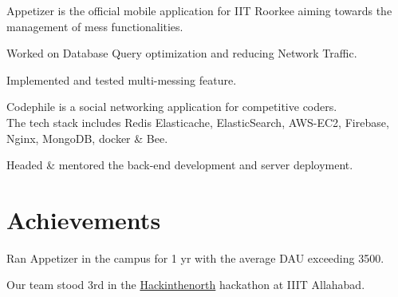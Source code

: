 \documentclass[letterpaper]{deedy-resume} %
\begin{document}
\begin{minipage}[t]{0.66\textwidth}
Appetizer is the official mobile application for IIT Roorkee aiming towards the management of mess functionalities.
\begin{tightitemize}
\item Worked on Database Query optimization and reducing Network Traffic.
\item Implemented and tested multi-messing feature.
\end{tightitemize}
\sectionspace %


Codephile is a social networking application for competitive coders.\\
The tech stack includes Redis Elasticache, ElasticSearch, AWS-EC2, Firebase, Nginx, MongoDB, docker \& Bee.
\begin{tightitemize}
\item Headed \& mentored the back-end development and server deployment.
\end{tightitemize}




\section{Achievements} 
\begin{tightitemize}
\sectionspace %
\item Ran Appetizer in the campus for 1 yr with the average DAU exceeding 3500. 
\item Our team stood 3rd in the \href{https://www.hackinthenorth.com/}{Hackinthenorth} hackathon at IIIT Allahabad. 


\end{tightitemize}

\sectionspace %


\end{minipage} %
\end{document}
